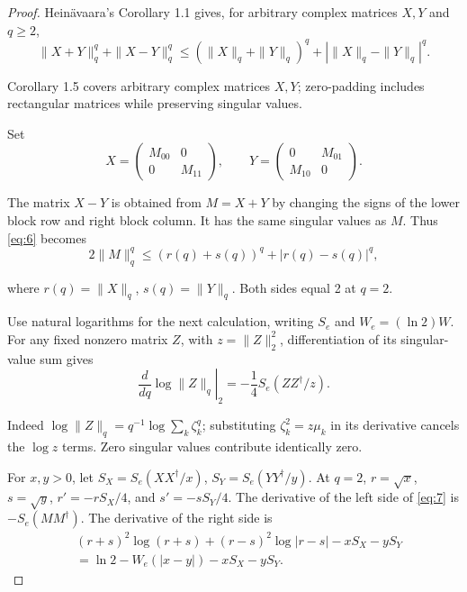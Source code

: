 \documentclass[10pt,letterpaper]{article}
\begin{document}
\begin{proof}

Heinävaara's Corollary 1.1 \cite{ref2} gives, for arbitrary complex matrices \(X,Y\) and \(q\ge2\),
\begin{equation}
\|X+Y\|_q^q+\|X-Y\|_q^q
\le(\|X\|_q+\|Y\|_q)^q+|\|X\|_q-\|Y\|_q|^q.
\label{eq:6}
\end{equation}

Corollary 1.5 covers arbitrary complex matrices \(X,Y\); zero-padding includes rectangular matrices while preserving singular values.

Set
\begin{equation*}
X=\begin{pmatrix}M_{00}&0\\0&M_{11}\end{pmatrix},\qquad
Y=\begin{pmatrix}0&M_{01}\\M_{10}&0\end{pmatrix}.
\end{equation*}

The matrix \(X-Y\) is obtained from \(M=X+Y\) by changing the signs of the lower block row and right block column. It has the same singular values as \(M\). Thus \eqref{eq:6} becomes
\begin{equation}
2\|M\|_q^q\le(r(q)+s(q))^q+|r(q)-s(q)|^q,
\label{eq:7}
\end{equation}

where \(r(q)=\|X\|_q\), \(s(q)=\|Y\|_q\). Both sides equal 2 at \(q=2\).

Use natural logarithms for the next calculation, writing \(S_e\) and \(W_e=(\ln2)W\). For any fixed nonzero matrix \(Z\), with \(z=\|Z\|_2^2\), differentiation of its singular-value sum gives
\begin{equation}
\left.\frac{d}{dq}\log\|Z\|_q\right|_2
=-\frac14S_e(ZZ^\dagger/z).
\label{eq:8}
\end{equation}

Indeed \(\log\|Z\|_q=q^{-1}\log\sum_k\zeta_k^q\); substituting \(\zeta_k^2=z\mu_k\) in its derivative cancels the \(\log z\) terms. Zero singular values contribute identically zero.

For \(x,y>0\), let \(S_X=S_e(XX^\dagger/x)\), \(S_Y=S_e(YY^\dagger/y)\). At \(q=2\), \(r=\sqrt{x}\), \(s=\sqrt{y}\), \(r'=-rS_X/4\), and \(s'=-sS_Y/4\). The derivative of the left side of \eqref{eq:7} is \(-S_e(MM^\dagger)\). The derivative of the right side is
\begin{equation}
\begin{aligned}
& (r+s)^2\log(r+s)+(r-s)^2\log|r-s|-xS_X-yS_Y\\
&=\ln2-W_e(|x-y|)-xS_X-yS_Y.
\end{aligned}
\label{eq:9}
\end{equation}


\end{proof}
\end{document}
